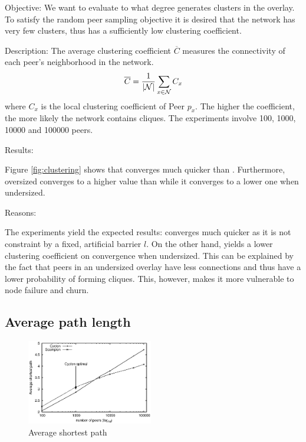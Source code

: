 \begin{asparadesc}
\item[Objective:]
    We want to evaluate to what degree \SCAMPLON{} generates clusters in the overlay.
    To satisfy the random peer sampling objective it is desired that the network has very few clusters,
    thus has a sufficiently low clustering coefficient.
\item[Description:] 
    The average clustering coefficient $\overline{C}$  measures the connectivity of each peer's neighborhood in the network.
  \begin{equation}
    \overline{C} = {1\over |\mathcal{N}|}\sum\limits_{x\in\mathcal{N}}C_x
    \end{equation}
    where $C_x$ is the local clustering coefficient of Peer $p_x$. The higher
    the coefficient, the more likely the network contains cliques. 
    The experiments involve 100, 1000, 10000 and 100000 peers. 


\item[Results:]

    Figure \ref{fig:clustering} shows that \SCAMPLON{} converges much quicker than \CYCLON{}.
    Furthermore, oversized \CYCLON{} converges to a higher value than \SCAMPLON while 
    it converges to a lower one when undersized.

\item[Reasons:]

    The experiments yield the expected results: 
    \SCAMPLON{} converges much quicker as it is not constraint by a fixed, artificial barrier $l$.
    On the other hand, \CYCLON{} yields a lower clustering coefficient on convergence when undersized.
    This can be explained by the fact that peers in an undersized \CYCLON{} overlay have less connections and 
    thus have a lower probability of forming cliques.
    This, however, makes it more vulnerable to node failure and churn.

\end{asparadesc}



\subsection{Average path length}

\begin{figure}
    \centering
    \includegraphics[width=0.49\textwidth]{img/avgpath.eps}
    \caption{Average shortest path}
    \label{fig:avgpath}
\end{figure}

